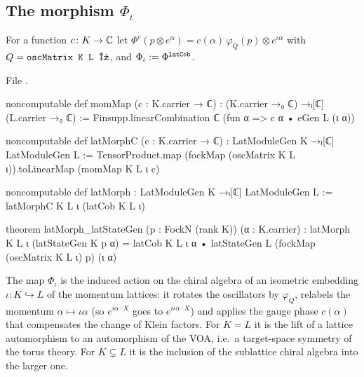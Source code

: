 \subsection{The morphism \texorpdfstring{$\Phi_\iota$}{Phi\_iota}}

\begin{definition}\label{ch03:def:latMorph}
For a function $c\colon K\to{\mathbb{C}}$ let $\Phi^c(p\otimes e^\alpha)=c(\alpha)\,\varphi_Q(p)\otimes
e^{\iota\alpha}$ with $Q=\lean{oscMatrix K L ι}$, and $\Phi_\iota:=\Phi^{\lean{latCob}}$.
\end{definition}
\noindent File .
\begin{leancode}
noncomputable def momMap (c : K.carrier → ℂ) : (K.carrier →₀ ℂ) →ₗ[ℂ] (L.carrier →₀ ℂ) :=
  Finsupp.linearCombination ℂ (fun α => c α • eGen L (ι α))

noncomputable def latMorphC (c : K.carrier → ℂ) : LatModuleGen K →ₗ[ℂ] LatModuleGen L :=
  TensorProduct.map (fockMap (oscMatrix K L ι)).toLinearMap (momMap K L ι c)

noncomputable def latMorph : LatModuleGen K →ₗ[ℂ] LatModuleGen L := latMorphC K L ι (latCob K L ι)

theorem latMorph_latStateGen (p : FockN (rank K)) (α : K.carrier) :
    latMorph K L ι (latStateGen K p α)
      = latCob K L ι α • latStateGen L (fockMap (oscMatrix K L ι) p) (ι α)
\end{leancode}

\begin{physics}
The map $\Phi_\iota$ is the induced action on the chiral algebra of an isometric embedding $\iota\colon K\hookrightarrow L$ of the momentum lattices: it rotates the oscillators by $\varphi_Q$, relabels the momentum $\alpha\mapsto\iota\alpha$ (so $e^{i\alpha\cdot X}$ goes to $e^{i\iota\alpha\cdot X}$) and applies the gauge phase $c(\alpha)$ that compensates the change of Klein factors. For $K=L$ it is the lift of a lattice automorphism to an automorphism of the VOA, i.e.\ a target-space symmetry of the torus theory. For $K\subsetneq L$ it is the inclusion of the sublattice chiral algebra into the larger one.
\end{physics}

